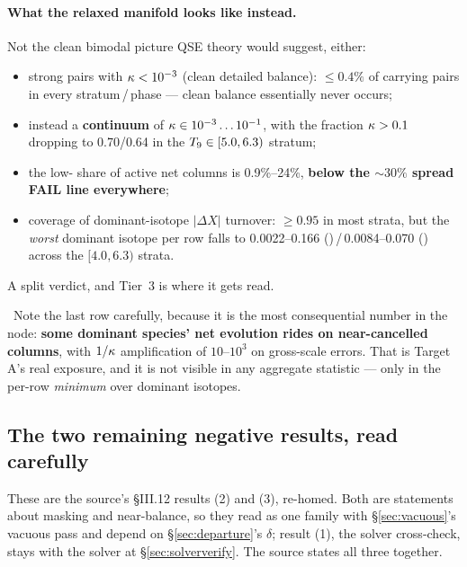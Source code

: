 \paragraph{What the relaxed manifold looks like instead.} Not the clean bimodal
picture QSE theory would suggest, either:

\begin{itemize}
\item strong pairs with $\kappa < 10^{-3}$ (clean detailed balance):
  \textbf{$\le 0.4\%$} of carrying pairs in every stratum\,/\,phase --- clean
  balance essentially never occurs;
\item instead a \textbf{continuum} of $\kappa \in 10^{-3}\ldots10^{-1}$, with the
  fraction $\kappa > 0.1$ dropping to 0.70/0.64 in the
  $T_{9} \in [5.0, 6.3)$ stratum;
\item the low-\kap{} share of active net columns is 0.9\%--24\%, \textbf{below
  the ${\sim}30\%$ spread FAIL line everywhere};
\item coverage of dominant-isotope $|\Delta X|$ turnover: $\ge 0.95$ in most
  strata, but the \emph{worst} dominant isotope per row falls to 0.0022--0.166
  ()\,/\,0.0084--0.070 () across the $[4.0, 6.3)$ strata.
\end{itemize}

 A split verdict, and Tier~3 is where it gets read.

\begin{warn}
\warnglyph{}~Note the last row carefully, because it is the most consequential
number in the node: \textbf{some dominant species' net evolution rides on
near-cancelled columns}, with $1/\kappa$ amplification of $10$--$10^{3}$ on
gross-scale errors. That is Target A's real exposure, and it is not visible in
any aggregate statistic --- only in the per-row \emph{minimum} over dominant
isotopes.
\end{warn}

\subsection{The two remaining negative results, read carefully}
\label{sec:negresults}

\begin{aside}
These are the source's \S III.12 results (2) and (3), re-homed. Both are
statements about masking and near-balance, so they read as one family with
\S\ref{sec:vacuous}'s vacuous pass and depend on \S\ref{sec:departure}'s
$\delta$; result (1), the solver cross-check, stays with the solver at
\S\ref{sec:solververify}. The source states all three together.
\end{aside}

